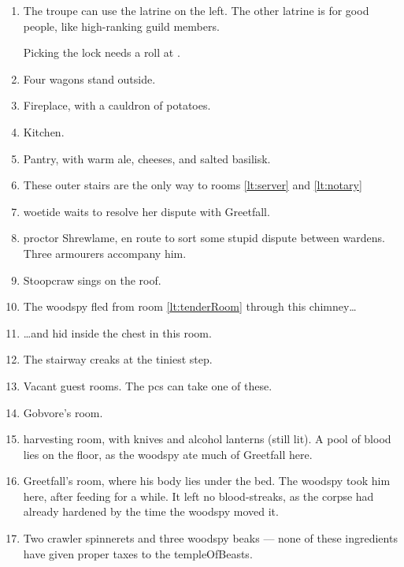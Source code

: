 \documentclass[10pt,twoside]{book}
\begin{document}
\begin{enumerate}\itemsep0em
  \item
  The troupe can use the latrine on the left.
  The other latrine is for good people, like high-ranking guild members.

  Picking the lock needs a  roll at \tn[10].
  \label{lt:latrines}
  \item
  Four wagons stand outside.
  \label{lt:wagons}
  \item
  Fireplace, with a cauldron of potatoes.
  \label{lt:fire}
  \item
  Kitchen.
  \label{lt:kitchen}
  \item
  Pantry, with warm ale, cheeses, and salted \gls{basilisk}.
  \label{lt:pantry}
  \item
  These outer stairs are the only way to rooms \ref{lt:server} and \ref{lt:notary}
  \label{lt:runway}
  \item
  \Gls{woetide} waits to resolve her dispute with Greetfall.
  \label{lt:notary}
  \item
  \Gls{proctor} Shrewlame, en route to sort some stupid dispute between \glspl{warden}.
  Three \glspl{armourer} accompany him.
  \label{lt:proctor}
  \item
  Stoopcraw sings on the roof.
  \label{lt:singer}
  \item
  The \gls{woodspy} fled from room \vref{lt:tenderRoom} through this chimney\ldots
  \label{lt:chimney}
  \item
  \ldots and hid inside the chest in this room.
  \label{lt:woodspy}
  \item
  The stairway creaks at the tiniest step.
  \label{lt:stairs}
  \item
  Vacant guest rooms.
  The \glspl{pc} can take one of these.
  \label{lt:guests}
  \item
  Gobvore's room.
  \label{lt:server}
  \item
  \Gls{harvesting} room, with knives and alcohol lanterns (still lit).
  A pool of blood lies on the floor, as the \gls{woodspy} ate much of  Greetfall here.
  \label{lt:cutting}
  \item
  Greetfall's room, where his body lies under the bed.
  The \gls{woodspy} took him here, after feeding for a while.
  It left no blood-streaks, as the corpse had already hardened by the time the \gls{woodspy} moved it.
  \label{lt:tenderRoom}
  \item
  Two \gls{crawler} spinnerets and three \gls{woodspy} beaks --- none of these \glspl{ingredient} have given proper taxes to the \gls{templeOfBeasts}.
  \label{lt:ingStore}
\end{enumerate}
\end{document}
